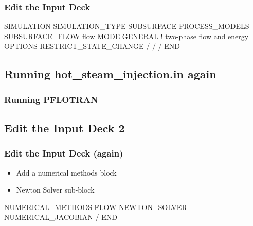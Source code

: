 \documentclass{beamer}
\begin{document}
\begin{frame}[fragile]\frametitle{Edit the Input Deck}

\begin{semiverbatim}

SIMULATION
  SIMULATION_TYPE SUBSURFACE
  PROCESS_MODELS
    SUBSURFACE_FLOW flow
      MODE GENERAL ! two-phase flow and energy
      OPTIONS
        RESTRICT_STATE_CHANGE
      /
    /
  /
END

\end{semiverbatim}

\end{frame}
\subsection{Running hot_steam_injection.in again}

\begin{frame}[fragile]\frametitle{Running PFLOTRAN}


\end{frame}

\subsection{Edit the Input Deck 2}

\begin{frame}[fragile]\frametitle{Edit the Input Deck (again)}

\begin{itemize}
\item Add a numerical methods block 
\item Newton Solver sub-block
\end{itemize}

\begin{semiverbatim}
NUMERICAL_METHODS FLOW
  NEWTON_SOLVER
    NUMERICAL_JACOBIAN
  /
END

\end{semiverbatim}

\end{frame}
\end{document}

